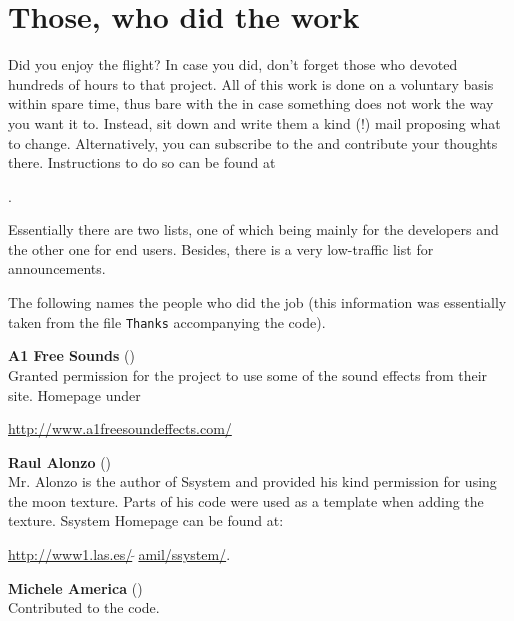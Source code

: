 
\section{Those, who did the work}

Did you enjoy the flight? In case you did, don't forget those who devoted hundreds of
hours to that project. All of this work is done on a voluntary basis within spare time,
thus bare with the  in case something does not work the way you want
it to. Instead, sit down and write them a kind (!) mail proposing what to change.
Alternatively, you can subscribe to the \FlightGear{}  and
contribute your thoughts there. Instructions to do so can be found at
 \medskip

 .
  \medskip

\noindent
 Essentially there are two lists, one of which being mainly for the developers
and the other one for end users. Besides, there is a very low-traffic list for
announcements.
\medskip

 \noindent
The following names the people who did the job (this information was essentially taken
from the file \texttt{Thanks} accompanying the code).
 \medskip

\noindent \textbf{A1 Free Sounds} ()\\
   Granted permission for the \FlightGear{} project to use some of the sound effects from their  
   site. Homepage under   
   \medskip
   
   \href{http://www.a1freesoundeffects.com/}{http://www.a1freesoundeffects.com/}
   \medskip

\noindent \textbf{Raul Alonzo} ()\\
   Mr. Alonzo is the
 author of Ssystem and provided his kind permission for using the moon texture.
 Parts of his code were used as a template when adding the texture.
  Ssystem Homepage can be found at:
   \medskip

  \href{http://www1.las.es/~amil/ssystem/}{http://www1.las.es/$\tilde{~~}$amil/ssystem/}.
 \medskip

 \noindent \textbf{Michele America}
()\\
  Contributed to the  code.
 \medskip

